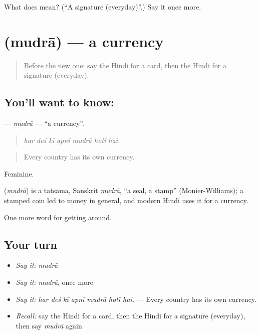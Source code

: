 \begin{tcolorbox}[breakable,colback=teal!4,colframe=teal!35!black,title={Before you move on}]
What does  mean? (\textquotedblleft{}A signature (everyday)\textquotedblright{}.) Say it once more.
\end{tcolorbox}
\section[\texorpdfstring{\hi{मुद्रा} (mudrā)}{मुद्रा (mudrā)}]{ (mudrā) — a currency}

\label{lesson:HI-C429-mudra}



\begin{quote}
Before the new one: say the Hindi for a card, then the Hindi for a signature (everyday).
\end{quote}

\subsection*{You'll want to know: }
\textbf{} — \emph{mudrā} — \textquotedblleft{}a currency\textquotedblright{}.

\begin{quote}
      
\end{quote}

\begin{quote}
\emph{har deś kī apnī mudrā hotī hai.}
\end{quote}

\begin{quote}
Every country has its own currency.
\end{quote}

Feminine.

\begin{cousinweb}
\textbf{} (\emph{mudrā}) is a tatsama, Sanskrit \emph{mudrā}, \textquotedblleft{}a seal, a stamp\textquotedblright{} (Monier-Williams); a stamped coin led to money in general, and modern Hindi uses it for a currency.
\end{cousinweb}

\begin{grammarlens}[title={What you've built}]
One more word for getting around.
\end{grammarlens}

\subsection*{Your turn}
\begin{itemize}
\raggedright
  \item \emph{Say it:} \emph{mudrā}
  \item \emph{Say it:} \emph{mudrā}, once more
  \item \emph{Say it:} \emph{har deś kī apnī mudrā hotī hai.} — Every country has its own currency.
  \item \emph{Recall:} say the Hindi for a card, then the Hindi for a signature (everyday), then say \emph{mudrā} again
\end{itemize}

